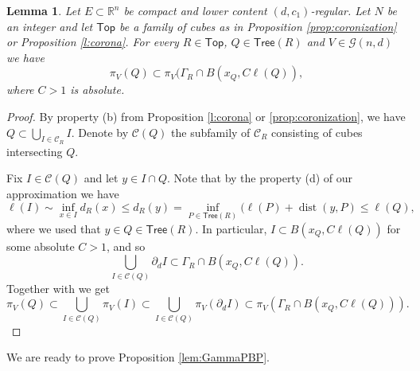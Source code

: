 \documentclass[11pt,reqno]{amsart}
\def\dG{{\mathcal{G}}}
\newcommand{\Top}{\mathsf{Top}}
\def\cC{{\mathscr{C}}}
\newcommand{\Tree}{\mathsf{Tree}}
\renewcommand{\d}{{\partial}}
\def\dist{\mathop\mathrm{dist}} 						%
\newtheorem{lemma}[theorem]{Lemma}
\theoremstyle{definition}
\theoremstyle{remark}
\numberwithin{equation}{section}
\newcommand{\R}{\mathbb{R}}
\theoremstyle{theorem}
\theoremstyle{definition}
\theoremstyle{remark}
\numberwithin{equation}{section}
\begin{document}
 \begin{lemma}\label{lem:aa}
     Let $E \subset \R^n$ be compact and lower content $(d,c_1)$-regular. Let $N$ be an integer and let $\Top$ be a family of cubes as in Proposition \ref{prop:coronization} or Proposition \ref{l:corona}. For every $R\in\Top$, $Q\in\Tree(R)$ and $V\in\dG(n,d)$ we have
     \begin{equation*}
         \pi_V(Q)\subset \pi_V(\Gamma_R\cap B(x_Q, C\ell(Q)),
     \end{equation*}
     where $C>1$ is absolute.
 \end{lemma}
 \begin{proof}
     By property (b) from Proposition \ref{l:corona} or \ref{prop:coronization}, we have $Q\subset \bigcup_{I\in\cC_R}I$. Denote by $\cC(Q)$ the subfamily of $\cC_R$ consisting of cubes intersecting $Q$. 
     
     Fix $I\in \cC(Q)$ and let $y\in I\cap Q$. Note that by the property (d) of our approximation we have
     \begin{equation*}
         \ell(I)\sim \inf_{x\in I}d_R(x)\le d_R(y) = \inf_{P\in\Tree(R)}(\ell(P)+\dist(y,P)\le \ell(Q),
     \end{equation*}
     where we used that $y\in Q\in\Tree(R)$. In particular, $I\subset B(x_Q,C\ell(Q))$ for some absolute $C>1$, and so
     \begin{equation*}
         \bigcup_{I\in\cC(Q)}\d_d I\subset \Gamma_R\cap B(x_Q, C\ell(Q)).
     \end{equation*}     
     Together with  we get
     \begin{equation*}
         \pi_V(Q)\subset \bigcup_{I\in\cC(Q)}\pi_V(I)\subset \bigcup_{I\in\cC(Q)}\pi_V(\d_d I)\subset \pi_V(\Gamma_R\cap B(x_Q, C\ell(Q))).
     \end{equation*}     
 \end{proof}
 We are ready to prove Proposition \ref{lem:GammaPBP}.
\end{document}
